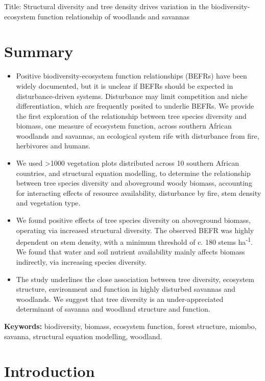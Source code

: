\documentclass[11pt,a4paper]{article}
\newcommand{\titletext}{Structural diversity and tree density drives variation in the biodiversity-ecosystem function relationship of woodlands and savannas}
\begin{document}
{\Large{Title: \titletext{}}}

\section*{Summary}

\begin{itemize}
	\item{Positive biodiversity-ecosystem function relationships (BEFRs) have been widely documented, but it is unclear if BEFRs should be expected in disturbance-driven systems. Disturbance may limit competition and niche differentiation, which are frequently posited to underlie BEFRs. We provide the first exploration of the relationship between tree species diversity and biomass, one measure of ecosystem function, across southern African woodlands and savannas, an ecological system rife with disturbance from fire, herbivores and humans.}
	\item{We used >1000 vegetation plots distributed across 10 southern African countries, and structural equation modelling, to determine the relationship between tree species diversity and aboveground woody biomass, accounting for interacting effects of resource availability, disturbance by fire, stem density and vegetation type.}
	\item{We found positive effects of tree species diversity on aboveground biomass, operating via increased structural diversity. The observed BEFR was highly dependent on stem density, with a minimum threshold of c. 180 stems ha\textsuperscript{-1}. We found that water and soil nutrient availability mainly affects biomass indirectly, via increasing species diversity.}
	\item{The study underlines the close association between tree diversity, ecosystem structure, environment and function in highly disturbed savannas and woodlands. We suggest that tree diversity is an under-appreciated determinant of savanna and woodland structure and function.}
\end{itemize}

\textbf{Keywords:} biodiversity, biomass, ecosystem function, forest structure, miombo, savanna, structural equation modelling, woodland.

\section{Introduction}
\end{document}
